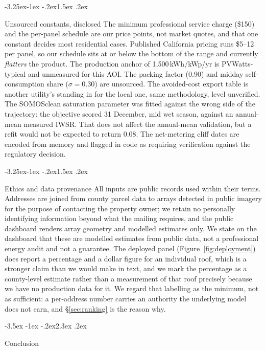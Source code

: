 \documentclass[10pt,twocolumn]{article}
\makeatletter
\renewcommand\section{\@startsection{section}{1}{\z@}%
  {-3.5ex \@plus -1ex \@minus -.2ex}{2.3ex \@plus.2ex}%
  {\normalfont\Large\bfseries\raggedright}}
\renewcommand\subsection{\@startsection{subsection}{2}{\z@}%
  {-3.25ex\@plus -1ex \@minus -.2ex}{1.5ex \@plus .2ex}%
  {\normalfont\large\bfseries\raggedright}}
\makeatother
\begin{document}
\subsection{Unsourced constants, disclosed}
\label{sec:unsourced}
The minimum professional service charge (\$150) and the
per-panel schedule are our price points, not market quotes, and that one constant decides
most residential cases. Published California pricing runs \$5--12 per panel, so our
schedule sits at or below the bottom of the range and currently \emph{flatters} the
product. The production anchor of 1{,}500\,kWh/kWp/yr
is PVWatts-typical and unmeasured for this AOI. The packing factor (0.90) and midday
self-consumption share ($\sigma = 0.30$) are unsourced. The avoided-cost export table is
another utility's standing in for the local one, same methodology, level unverified. The SOMOSclean saturation parameter was fitted against the wrong side of the trajectory:
the objective scored 31 December, mid wet season, against an annual-mean measured IWSR.
That does not affect the annual-mean validation, but a refit would not be expected to
return 0.08. The net-metering cliff dates are encoded from memory and flagged in code as
requiring verification against the regulatory decision.

\subsection{Ethics and data provenance}
All inputs are public records used within their terms. Addresses are joined from county
parcel data to arrays detected in public imagery for the purpose of contacting the
property owner; we retain no personally identifying information beyond what the mailing
requires, and the public dashboard renders array geometry and modelled estimates only. We
state on the dashboard that these are modelled estimates from public data, not a
professional energy audit and not a guarantee. The deployed panel
(Figure~\ref{fig:deployment}) does report a percentage and a dollar figure for an
individual roof, which is a stronger claim than we would make in text, and we mark the
percentage as a county-level estimate rather than a measurement of that roof precisely
because we have no production data for it. We regard that labelling as the minimum, not as
sufficient: a per-address number carries an authority the underlying model does not earn,
and \S\ref{sec:ranking} is the reason why.

\section{Conclusion}
\label{sec:conclusion}
\end{document}
